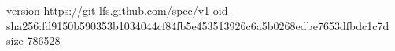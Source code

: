 version https://git-lfs.github.com/spec/v1
oid sha256:fd9150b590353b1034044cf84fb5e453513926c6a5b0268edbe7653dfbdc1c7d
size 786528
